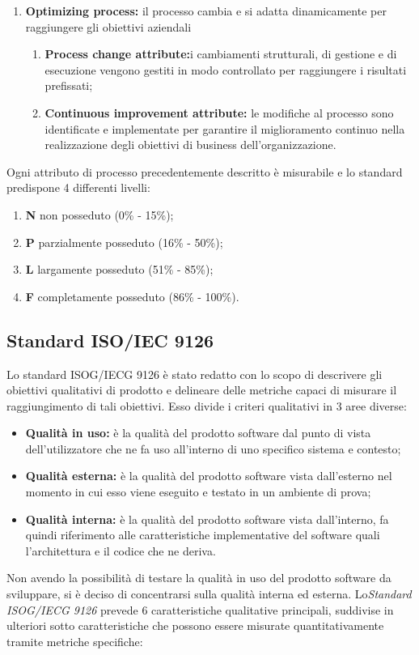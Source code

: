 \documentclass[12pt,a4paper]{article}
\begin{document}
\begin{enumerate}
	\item\textbf{Optimizing process:} il processo cambia e si adatta dinamicamente per raggiungere
	gli obiettivi aziendali
	\begin{enumerate}
		\item \textbf{Process change attribute:}i cambiamenti strutturali, di gestione e di
		esecuzione vengono gestiti in modo controllato per raggiungere i risultati prefissati;
		\item \textbf{Continuous improvement attribute:} le modifiche al processo sono identificate e implementate per garantire il miglioramento continuo nella realizzazione
		degli obiettivi di business dell'organizzazione.
	\end{enumerate}
\end{enumerate}

Ogni attributo di processo precedentemente descritto è misurabile e lo standard predispone
4 differenti livelli:
\begin{enumerate}
	\item \textbf{N} non posseduto (0\% - 15\%);
	\item \textbf{P} parzialmente posseduto (16\% - 50\%);
	\item \textbf{L} largamente posseduto (51\% - 85\%);
	\item \textbf{F} completamente posseduto (86\% - 100\%).
\end{enumerate}

\subsection{Standard ISO/IEC 9126}
Lo standard ISOG/IECG 9126 è stato redatto con lo scopo di descrivere gli obiettivi
qualitativi di prodotto e delineare delle metriche capaci di misurare il raggiungimento
di tali obiettivi. Esso divide i criteri qualitativi in 3 aree diverse:
\begin{itemize}
	\item \textbf{Qualità in uso:} è la qualità del prodotto software dal punto di vista dell'utilizzatore che ne fa uso all'interno di uno specifico sistema e contesto;
	\item \textbf{Qualità esterna:} è la qualità del prodotto software vista dall'esterno nel momento in cui esso viene eseguito e testato in un ambiente di prova;
	\item \textbf{Qualità interna:} è la qualità del prodotto software vista dall'interno, fa quindi riferimento alle caratteristiche implementative del software quali l'architettura e il codice che ne deriva.
\end{itemize}
Non avendo la possibilità di testare la qualità in uso del prodotto software da sviluppare, si è deciso di concentrarsi sulla qualità interna ed esterna. Lo\textit{Standard ISOG/IECG 9126}
prevede 6 caratteristiche qualitative principali, suddivise in ulteriori sotto caratteristiche
che possono essere misurate quantitativamente tramite metriche specifiche:
\end{document}
